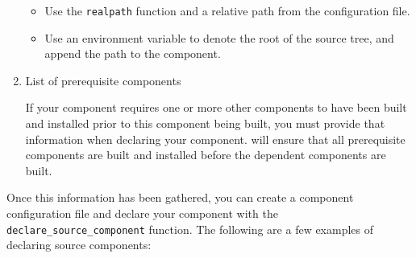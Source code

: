 \begin{enumerate}
  \begin{itemize}
    \item Use the \gnumake \texttt{realpath} function and a relative path from
      the configuration file.
    \item Use an environment variable to denote the root of the source
      tree, and append the path to the component.
  \end{itemize}

\item List of prerequisite components

  If your component requires one or more other components to have been
  built and installed prior to this component being built, you must
  provide that information when declaring your component.  \lmsbw will
  ensure that all prerequisite components are built and installed
  before the dependent components are built.
\end{enumerate}

Once this information has been gathered, you can create a component
configuration file and declare your component with the
\texttt{declare\_source\_component} function.  The following are a few
examples of declaring source components:

